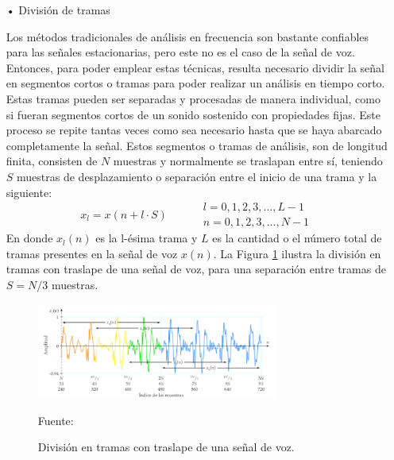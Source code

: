 \begin{enumerate}
\begin{enumerate}
\item[•]División de tramas
\par
Los métodos tradicionales de análisis en frecuencia son bastante confiables para las señales estacionarias, pero este no es el caso de la señal de voz. Entonces, para poder emplear estas técnicas, resulta necesario dividir la señal en segmentos cortos o tramas para poder realizar un análisis en tiempo corto. Estas tramas pueden ser separadas y procesadas de manera individual, como si fueran segmentos cortos de un sonido sostenido con propiedades fijas. Este proceso se repite tantas veces como sea necesario hasta que se haya abarcado completamente la señal.
\vskip 0.5cm
Estos segmentos o tramas de análisis, son de longitud finita, consisten de $N$ muestras y normalmente se traslapan entre sí, teniendo $S$ muestras de desplazamiento o separación entre el inicio de una trama y la siguiente:
\begin{equation}
\label{eq:ecuacion33}
x_{l} = x(n + l \cdot S)\qquad
\begin{aligned}
& l = 0,1,2,3,...,L-1 \\
& n = 0,1,2,3,...,N-1
\end{aligned}
\end{equation}
En donde $x_{l}(n)$ es la l-ésima trama y $L$ es la cantidad o el número total de tramas presentes en la señal de voz $x(n)$. La Figura \ref{fig:figura2.33} ilustra la división en tramas con traslape de una señal de voz, para una separación entre tramas de $S = N/3$ muestras.
\begin{figure}[ht]
\begin{center}
\includegraphics[width=0.75\textwidth]{Imagenes/Cap2/image034}
\end{center}
\begin{center}
\vskip -0.5cm
\caption{\small{División en tramas con traslape de una señal de voz.}}
\label{fig:figura2.33}
{\small{Fuente: \cite{perez}}}
\end{center}
\end{figure}


\end{enumerate}
\end{enumerate}

